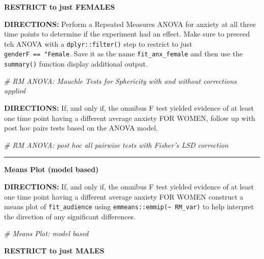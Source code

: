 \documentclass[]{article}
\newenvironment{Shaded}{\begin{snugshade}}{\end{snugshade}}
\newcommand{\CommentTok}[1]{\textcolor[rgb]{0.56,0.35,0.01}{\textit{#1}}}
\begin{document}
\clearpage

\textbf{RESTRICT to just FEMALES}

\textbf{DIRECTIONS:} Perform a Repeated Measures ANOVA for anxiety at
all three time points to determine if the experiment had an effect. Make
sure to preceed teh ANOVA with a \texttt{dplyr::filter()} step to
restrict to just \texttt{genderF\ ==\ "Female}. Save it as the name
\texttt{fit\_anx\_female} and then use the \texttt{summary()} function
display additional output.

\begin{Shaded}
\begin{Highlighting}[]
\CommentTok{# RM ANOVA: Mauchle Tests for Sphericity with and without corrections applied}
\end{Highlighting}
\end{Shaded}

\clearpage

\textbf{DIRECTIONS:} If, and only if, the omnibus F test yielded
evidence of at least one time point having a different average anxiety
FOR WOMEN, follow up with post hoc pairs tests based on the ANOVA model.

\begin{Shaded}
\begin{Highlighting}[]
\CommentTok{# RM ANOVA: post hoc all pairwise tests with Fisher's LSD correction}
\end{Highlighting}
\end{Shaded}

\begin{center}\rule{0.5\linewidth}{\linethickness}\end{center}

\textbf{Means Plot (model based)}

\textbf{DIRECTIONS:} If, and only if, the omnibus F test yielded
evidence of at least one time point having a different average anxiety
FOR WOMEN construct a means plot of \texttt{fit\_audience} using
\texttt{emmeans::emmip(\textasciitilde{}\ RM\_var)} to help interpret
the direction of any significant differences.

\begin{Shaded}
\begin{Highlighting}[]
\CommentTok{# Means Plot: model based}
\end{Highlighting}
\end{Shaded}

\clearpage

\textbf{RESTRICT to just MALES}
\end{document}
